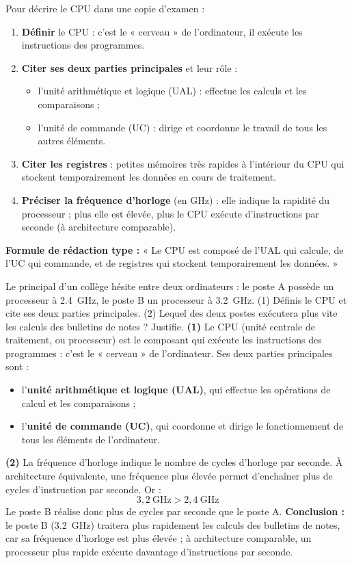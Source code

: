 \documentclass[11pt]{article}
\newcommand{\cle}[1]{{\popxbold\color{popdark}#1}}
\begin{document}
\begin{methode}
Pour décrire le CPU dans une copie d'examen :
\begin{enumerate}
\item \textbf{Définir} le CPU : c'est le « cerveau » de l'ordinateur, il exécute les instructions des programmes.
\item \textbf{Citer ses deux parties principales} et leur rôle :
\begin{itemize}
\item l'\cle{unité arithmétique et logique} (UAL) : effectue les calculs et les comparaisons ;
\item l'\cle{unité de commande} (UC) : dirige et coordonne le travail de tous les autres éléments.
\end{itemize}
\item \textbf{Citer les registres} : petites mémoires très rapides à l'intérieur du CPU qui stockent temporairement les données en cours de traitement.
\item \textbf{Préciser la fréquence d'horloge} (en GHz) : elle indique la rapidité du processeur ; plus elle est élevée, plus le CPU exécute d'instructions par seconde (à architecture comparable).
\end{enumerate}
\textbf{Formule de rédaction type :} « Le CPU est composé de l'UAL qui calcule, de l'UC qui commande, et de registres qui stockent temporairement les données. »
\end{methode}

\begin{exoresolu}
Le principal d'un collège hésite entre deux ordinateurs : le poste A possède un processeur à \SI{2,4}{GHz}, le poste B un processeur à \SI{3,2}{GHz}. (1) Définis le CPU et cite ses deux parties principales. (2) Lequel des deux postes exécutera plus vite les calculs des bulletins de notes ? Justifie.
\tcblower
\textbf{(1)} Le \cle{CPU} (unité centrale de traitement, ou processeur) est le composant qui exécute les instructions des programmes : c'est le « cerveau » de l'ordinateur. Ses deux parties principales sont :
\begin{itemize}
\item l'\textbf{unité arithmétique et logique (UAL)}, qui effectue les opérations de calcul et les comparaisons ;
\item l'\textbf{unité de commande (UC)}, qui coordonne et dirige le fonctionnement de tous les éléments de l'ordinateur.
\end{itemize}
\textbf{(2)} La fréquence d'horloge indique le nombre de cycles d'horloge par seconde. À architecture équivalente, une fréquence plus élevée permet d'enchaîner plus de cycles d'instruction par seconde. Or :
\[ 3,2\ \text{GHz} > 2,4\ \text{GHz} \]
Le poste B réalise donc plus de cycles par seconde que le poste A.
\textbf{Conclusion :} le poste B (\SI{3,2}{GHz}) traitera plus rapidement les calculs des bulletins de notes, car sa fréquence d'horloge est plus élevée ; à architecture comparable, un processeur plus rapide exécute davantage d'instructions par seconde.
\end{exoresolu}
\end{document}
